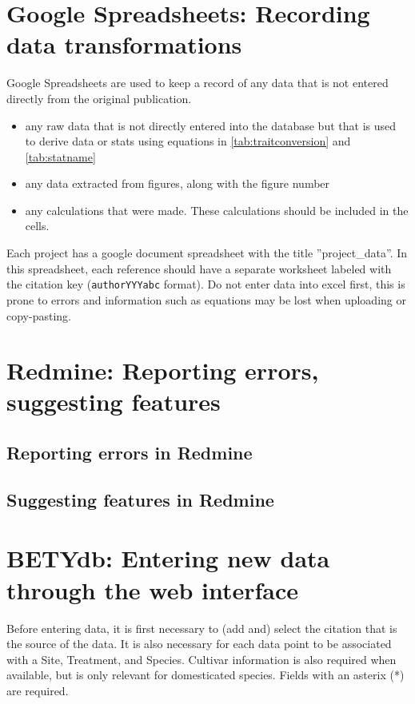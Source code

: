 \documentclass[12pt,english,portrait]{article}
\begin{document}
\section{Google Spreadsheets: Recording data transformations}\label{sec:googlespreadsheets}

Google Spreadsheets are used to keep a record of any data that is not entered directly from the original publication.

\begin{itemize}
\item any raw data that is not directly entered into the database but that is used to derive data or stats using equations in \autoref{tab:traitconversion} and \autoref{tab:statname}
\item any data extracted from figures, along with the figure number
\item any calculations that were made. These calculations should be included in the cells.
\end{itemize}

Each project has a google document spreadsheet with the title ''project\_data''.
In this spreadsheet, each reference should have a separate worksheet labeled with the citation key (\verb+authorYYYabc+ format).
Do not enter data into excel first, this is prone to errors and information such as equations may be lost when uploading or copy-pasting. 

\section{Redmine: Reporting errors, suggesting features}
\subsection{Reporting errors in Redmine }
\subsection{Suggesting features in Redmine}
 
\section{BETYdb: Entering new data through the web interface}

Before entering data, it is first necessary to (add and) select the citation that is the source of the data.
It is also necessary for each data point to be associated with a Site, Treatment, and Species.
Cultivar information is also required when available, but is only relevant for domesticated species.
Fields with an asterix (*) are required.
\end{document}
